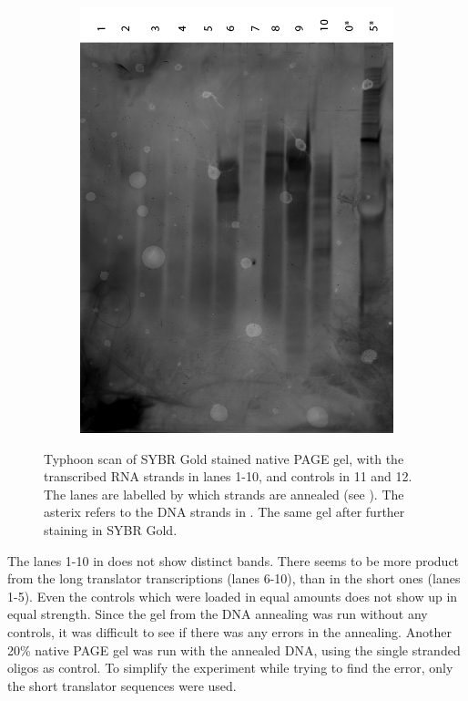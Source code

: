 \begin{figure}[h]
\begin{subfigure}[t]{0.49\textwidth}
    \includegraphics[width=\textwidth]{images/translator_transcription_2.png}
    \caption{}
    \label{transcription_2}
  \end{subfigure}
  \caption{ Typhoon scan of SYBR Gold stained native PAGE gel, with the transcribed RNA strands in lanes 1-10, and controls in 11 and 12. The lanes are labelled by which strands are annealed (see ). The asterix refers to the DNA strands in .  The same gel after further staining in SYBR Gold.}
\end{figure}

The lanes 1-10 in  does not show distinct bands. There seems to be more product from the long translator transcriptions (lanes 6-10), than in the short ones (lanes 1-5). Even the controls which were loaded in equal amounts does not show up in equal strength. Since the gel from the DNA annealing was run without any controls, it was difficult to see if there was any errors in the annealing. Another 20\% native PAGE gel was run with the annealed DNA, using the single stranded oligos as control. To simplify the experiment while trying to find the error, only the short translator sequences were used.

